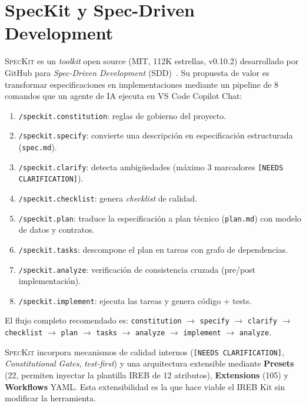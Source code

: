 \section{SpecKit y Spec-Driven Development}

\textsc{SpecKit} es un \emph{toolkit} open source (MIT, 112K estrellas, v0.10.2) desarrollado por GitHub para \emph{Spec-Driven Development} (SDD)~\cite{speckit_repo,speckit_sdd}. Su propuesta de valor es transformar especificaciones en implementaciones mediante un pipeline de 8 comandos que un agente de IA ejecuta en VS Code Copilot Chat:

\begin{enumerate}
    \item \texttt{/speckit.constitution}: reglas de gobierno del proyecto.
    \item \texttt{/speckit.specify}: convierte una descripci\'on en especificaci\'on estructurada (\texttt{spec.md}).
    \item \texttt{/speckit.clarify}: detecta ambig\"uedades (m\'aximo 3 marcadores \texttt{[NEEDS CLARIFICATION]}).
    \item \texttt{/speckit.checklist}: genera \emph{checklist} de calidad.
    \item \texttt{/speckit.plan}: traduce la especificaci\'on a plan t\'ecnico (\texttt{plan.md}) con modelo de datos y contratos.
    \item \texttt{/speckit.tasks}: descompone el plan en tareas con grafo de dependencias.
    \item \texttt{/speckit.analyze}: verificaci\'on de consistencia cruzada (pre/post implementaci\'on).
    \item \texttt{/speckit.implement}: ejecuta las tareas y genera c\'odigo + tests.
\end{enumerate}

El flujo completo recomendado es: \texttt{constitution} $\rightarrow$ \texttt{specify} $\rightarrow$ \texttt{clarify} $\rightarrow$ \texttt{checklist} $\rightarrow$ \texttt{plan} $\rightarrow$ \texttt{tasks} $\rightarrow$ \texttt{analyze} $\rightarrow$ \texttt{implement} $\rightarrow$ \texttt{analyze}.

\textsc{SpecKit} incorpora mecanismos de calidad internos (\texttt{[NEEDS CLARIFICATION]}, \emph{Constitutional Gates}, \emph{test-first}) y una arquitectura extensible mediante \textbf{Presets} (22, permiten inyectar la plantilla IREB de 12 atributos), \textbf{Extensions} (105) y \textbf{Workflows} YAML. Esta extensibilidad es la que hace viable el IREB Kit sin modificar la herramienta.

